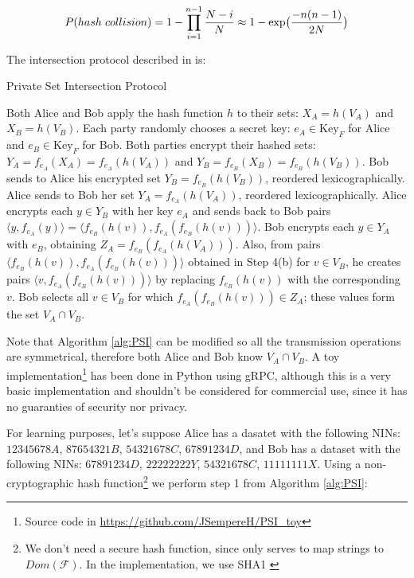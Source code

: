 \begin{equation*}
    P(hash \hspace*{0.3 em} collision) = 1 - \prod_{i=1}^{n-1} \frac{N-i}{N} \approx 1 - \exp \bigl( \frac{-n (n-1)}{2N} \bigr)
\end{equation*}

The intersection protocol described in \cite{agrawal} is:

\begin{algorithm}
\caption{Private Set Intersection Protocol}
\label{alg:PSI}
\begin{algorithmic}[1]
    \State Both Alice and Bob apply the hash function $h$ to their sets: $X_A = h(V_A)$ and $X_B = h(V_B)$. Each party randomly chooses a secret key: $e_A \in \text{Key}_F$ for Alice and $e_B \in \text{Key}_F$ for Bob.
    \State Both parties encrypt their hashed sets: $Y_A = f_{e_A}(X_A) = f_{e_A}(h(V_A))$ and $Y_B = f_{e_B}(X_B) = f_{e_B}(h(V_B))$.
    \State Bob sends to Alice his encrypted set $Y_B = f_{e_B}(h(V_B))$, reordered lexicographically.
    \State Alice sends to Bob her set $Y_A = f_{e_A}(h(V_A))$, reordered lexicographically.
    \State Alice encrypts each $y \in Y_B$ with her key $e_A$ and sends back to Bob pairs $\langle y, f_{e_A}(y) \rangle = \langle f_{e_B}(h(v)), f_{e_A}(f_{e_B}(h(v))) \rangle$.
    \State Bob encrypts each $y \in Y_A$ with $e_B$, obtaining $Z_A = f_{e_B}(f_{e_A}(h(V_A)))$. Also, from pairs $\langle f_{e_B}(h(v)), f_{e_A}(f_{e_B}(h(v))) \rangle$ obtained in Step 4(b) for $v \in V_B$, he creates pairs $\langle v, f_{e_A}(f_{e_B}(h(v))) \rangle$ by replacing $f_{e_B}(h(v))$ with the corresponding $v$.
    \State Bob selects all $v \in V_B$ for which $f_{e_A}(f_{e_B}(h(v))) \in Z_A$; these values form the set $V_A \cap V_B$.
\end{algorithmic}
\end{algorithm}

Note that Algorithm \ref{alg:PSI} can be modified so all the transmission operations are symmetrical, therefore both Alice and Bob know $V_A \cap V_B$. A toy implementation\footnote{Source code in \url{https://github.com/JSempereH/PSI_toy}} has been done in Python using gRPC, although this is a very basic implementation and shouldn't be considered for commercial use, since it has no guaranties of security nor privacy.

For learning purposes, let's suppose Alice has a dasatet with the following NINs: $12345678A$, $87654321B$, $54321678C$, $67891234D$, and Bob has a dataset with the following NINs: $67891234D$, $22222222Y$, $54321678C$, $11111111X$. Using a non-cryptographic hash function\footnote{We don't need a secure hash function, since only serves to map strings to $Dom(\mathcal{F})$. In the implementation, we use SHA1 \cite{sahu2017}} we perform step 1 from Algorithm \ref{alg:PSI}:


